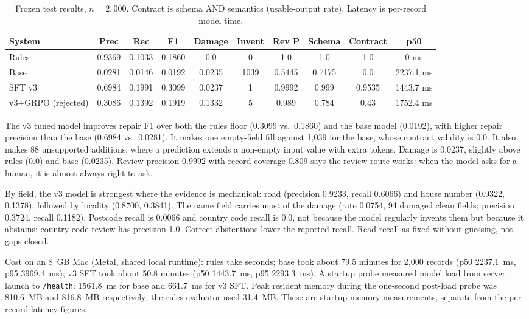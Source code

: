 \documentclass[11pt]{article}
\begin{document}
\begin{table}[H]
\centering
\footnotesize
\setlength{\tabcolsep}{4pt}
\renewcommand{\arraystretch}{1.18}
\caption{Frozen test results, $n=2{,}000$. Contract is schema AND
semantics (usable-output rate). Latency is per-record model time.}
\label{tab:main}
\begin{tabular}{lccccccccc}
\toprule
System & Prec & Rec & F1 & Damage & Invent & Rev P & Schema & Contract & p50 \\
\midrule
Rules & 0.9369 & 0.1033 & 0.1860 & 0.0 & 0 & 1.0 & 1.0 & 1.0 & 0 ms \\
Base & 0.0281 & 0.0146 & 0.0192 & 0.0235 & 1039 & 0.5445 & 0.7175 & 0.0 & 2237.1 ms \\
SFT v3 & 0.6984 & 0.1991 & 0.3099 & 0.0237 & 1 & 0.9992 & 0.999 & 0.9535 & 1443.7 ms \\
v3+GRPO (rejected) & 0.3086 & 0.1392 & 0.1919 & 0.1332 & 5 & 0.989 & 0.784 & 0.43 & 1752.4 ms \\
\bottomrule
\end{tabular}
\end{table}

The v3 tuned model improves repair F1 over both the rules floor
(0.3099 vs.\ 0.1860) and the base model (0.0192), with higher repair
precision than the base (0.6984 vs.\ 0.0281). It makes one empty-field
fill against 1,039 for the base, whose contract validity is 0.0. It
also makes 88 unsupported additions, where a prediction extends a
non-empty input value with extra tokens. Damage is 0.0237, slightly
above rules (0.0) and base (0.0235). Review precision 0.9992 with
record coverage 0.809 says the review route works: when the model asks
for a human, it is almost always right to ask.

By field, the v3 model is strongest where the evidence is mechanical:
road (precision 0.9233, recall 0.6066) and house number (0.9322,
0.1378), followed by locality (0.8700, 0.3841). The name field carries
most of the damage (rate 0.0754, 94 damaged clean fields; precision
0.3724, recall 0.1182). Postcode recall is 0.0066 and country code
recall is 0.0, not because the model regularly invents them but
because it abstains: country-code review has precision 1.0. Correct
abstentions lower the reported recall. Read recall as fixed without
guessing, not gaps closed.

Cost on an 8~GB Mac (Metal, shared local runtime): rules take
seconds; base took about 79.5 minutes for 2,000 records (p50
2237.1~ms, p95 3969.4~ms); v3 SFT took about 50.8 minutes (p50
1443.7~ms, p95 2293.3~ms). A startup probe measured model load from
server launch to \texttt{/health}: 1561.8~ms for base and 661.7~ms for
v3 SFT. Peak resident memory during the one-second post-load probe was
810.6~MB and 816.8~MB respectively; the rules evaluator used 31.4~MB.
These are startup-memory measurements, separate from the per-record
latency figures.
\end{document}
